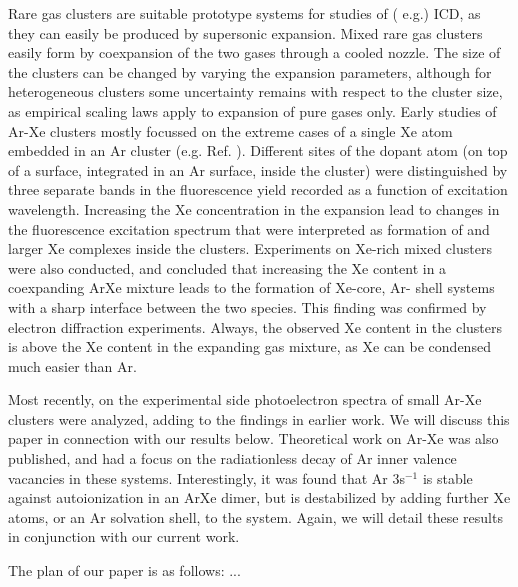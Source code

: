 Rare gas clusters are suitable prototype systems for studies of (
e.g.) ICD, as they can easily be produced by supersonic 
expansion. Mixed rare gas clusters easily form by coexpansion of 
the two gases through a cooled nozzle. The size of the clusters 
can be changed by varying the expansion parameters, although for 
heterogeneous clusters some uncertainty remains with respect to 
the cluster size, as empirical scaling laws \cite{hagena1981} 
apply to expansion of pure gases only. Early studies of Ar-Xe 
clusters mostly focussed on the extreme cases of a single Xe atom 
embedded in an Ar cluster (e.g. Ref. ). 
Different sites of the dopant atom (on top of a surface, 
integrated in an Ar surface, inside the cluster) were 
distinguished by three separate bands in the fluorescence yield 
recorded as a function of excitation wavelength.\cite{lengenprl} 
Increasing the Xe concentration in the expansion lead to changes 
in the fluorescence excitation spectrum that were interpreted as 
formation of  and larger Xe complexes inside the clusters.
\cite{lengen} Experiments on Xe-rich mixed clusters were also 
conducted, and concluded that increasing the Xe content in a 
coexpanding ArXe mixture leads to the formation of Xe-core, Ar-
shell systems with a sharp interface between the two species.\cite
{tchaplyguine,hoener} This finding was confirmed by electron 
diffraction experiments.\cite{Danylchenko} Always, the observed 
Xe content in the clusters is above the Xe content in the 
expanding gas mixture, as Xe can be condensed much easier than Ar.

Most recently, on the experimental side photoelectron spectra of 
small Ar-Xe clusters were analyzed, adding to the findings in 
earlier work.\cite{Lindblad} We will discuss this paper in 
connection with our results below. Theoretical work on Ar-Xe was 
also published, and had a focus on the radiationless decay of Ar 
inner valence vacancies in these systems.\cite{fasshauer,fasshauer
_b} Interestingly, it was found that Ar 3s$^{-1}$ is stable 
against autoionization in an ArXe dimer, but is destabilized by 
adding further Xe atoms, or an Ar solvation shell, to the system. 
Again, we will detail these results in conjunction with our 
current work.

The plan of our paper is as follows: ...



